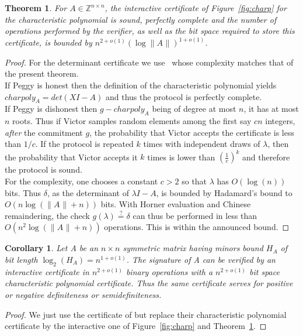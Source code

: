 \documentclass{article}
\newtheorem{theorem}{Theorem}
\newtheorem{corollary}{Corollary}
\newcommand{\Z}{\ensuremath{\mathbb Z}}\newcommand{\ZZ}{\Z}
\newcommand{\bigO}[1]{\ensuremath{O(#1)}\xspace}
\newcommand{\lognormA}{\log\| A\mspace{1mu} \|}
\begin{document}
\begin{theorem}\label{th:charp}
  For $A\in\Z^{n\times n}$, 
  the interactive certificate of Figure~\ref{fig:charp} for
  the characteristic polynomial is sound, perfectly complete and the number of
  operations performed by the verifier, as well as the bit space
  required to store this certificate, is bounded by
  $n^{2+o(1)}(\lognormA)^{1+o(1)}$.
\end{theorem}
\begin{proof}
  For the determinant certificate we
  use~\cite[Theorem~5]{Kaltofen:2011:quadcert} whose complexity
  matches that of the present theorem.\\
   
  If Peggy is honest then the definition of the
  characteristic polynomial yields $charpoly_A=det(X I -A)$ and thus
  the protocol is perfectly complete.\\
   
  If Peggy is dishonest then $g-charpoly_A$ being of degree at most
  $n$, it has at most $n$ roots. Thus if Victor samples random
  elements among the first say $c n$ integers, {\em after} the
  commitment $g$, the probability that
  Victor accepts the certificate is less than $1/c$. If the protocol
  is repeated $k$ times with independent draws of $\lambda$, then the
  probability that Victor accepts it $k$ times is lower than
  $\left(\frac{1}{c}\right)^k$ and therefore the protocol is sound.\\

  For the complexity, one chooses a constant $c>2$ so that $\lambda$
  has $\bigO{\log(n)}$ bits. Thus $\delta$, as the determinant of 
  $\lambda I -A$, is bounded by Hadamard's bound to
  $\bigO{n\log(\| A\mspace{1mu} \|+n)}$ bits.  
  With Horner evaluation and Chinese
  remaindering, the check 
  $g(\lambda)\stackrel{?}{=}\delta$ can thus be performed in less than
  $\bigO{n^2\log(\| A\mspace{1mu} \|+n)}$ operations.  
  This is within the announced bound. 
\end{proof}

\begin{corollary}
  Let A be an $n\times n$ symmetric matrix having
  minors bound $H_A$ of bit length $\log_2(H_A)=n^{1+o(1)}$. 
  The signature of A can be verified by an interactive certificate in 
  $n^{2+o(1)}$ binary operations with a 
  $n^{2+o(1)}$ bit space characteristic polynomial certificate. 
  Thus the same certificate serves for positive or negative definiteness
  or semidefiniteness.
\end{corollary}
\begin{proof}
  We just use the certificate of
  \cite[Corollary~1]{Kaltofen:2011:quadcert} but replace their
  characteristic polynomial certificate by the interactive one of
  Figure~\ref{fig:charp} and Theorem~\ref{th:charp}.
\end{proof}
\end{document}
